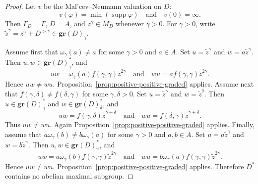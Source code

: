 \documentclass[10pt,a4paper]{amsart}
\begin{document}
\begin{proof}
Let $v$ be the Mal'cev--Neumann valuation on $D$:
\[
        v(\varphi)=\min(\operatorname{supp}\varphi)\quad\text{and}\quad v(0)=\infty.
\]
Then $\Gamma_D=\Gamma$, $\overline D=A$, and $z^\gamma\in M_D$ whenever
$\gamma>0$. For $\gamma>0$, write
$\widetilde z^\gamma=z^\gamma+D^{>\gamma}\in \mathbf{gr}(D)_\gamma$.

Assume first that $\omega_\gamma(a)\ne a$ for some $\gamma>0$ and $a\in A$.
Set $u=\widetilde z^\gamma$ and $w=a\widetilde z^\gamma$. Then
$u,w\in \mathbf{gr}(D)_\gamma^*$, and
\[
        uw=\omega_\gamma(a)f(\gamma,\gamma)\widetilde z^{2\gamma}
        \quad\text{and}\quad
        wu=af(\gamma,\gamma)\widetilde z^{2\gamma}.
\]
Hence $uw\ne wu$. Proposition~\ref{prop:positive-positive-graded} applies.
Assume next that $f(\gamma,\delta)\ne f(\delta,\gamma)$ for some
$\gamma,\delta>0$. Set $u=\widetilde z^\gamma$ and
$w=\widetilde z^\delta$. Then $u\in \mathbf{gr}(D)_\gamma^*$ and
$w\in \mathbf{gr}(D)_\delta^*$, and
\[
        uw=f(\gamma,\delta)\widetilde z^{\gamma+\delta}
        \quad\text{and}\quad
        wu=f(\delta,\gamma)\widetilde z^{\gamma+\delta}.
\]
Thus $uw\ne wu$. Again Proposition~\ref{prop:positive-positive-graded}
applies.
Finally, assume that $a\omega_\gamma(b)\ne b\omega_\gamma(a)$ for some
$\gamma>0$ and $a,b\in A$. Set $u=a\widetilde z^\gamma$ and
$w=b\widetilde z^\gamma$. Then $u,w\in \mathbf{gr}(D)_\gamma^*$, and
\[
        uw=a\omega_\gamma(b)f(\gamma,\gamma)\widetilde z^{2\gamma}
        \quad\text{and}\quad
        wu=b\omega_\gamma(a)f(\gamma,\gamma)\widetilde z^{2\gamma}.
\]
Hence $uw\ne wu$. Proposition~\ref{prop:positive-positive-graded} applies.
Therefore $D^*$ contains no abelian maximal subgroup.
\end{proof}
\end{document}

